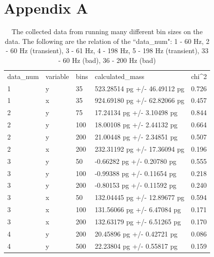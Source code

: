\documentclass[12pt]{article}
\begin{document}
\newpage
\clearpage
\section*{Appendix A}


\begin{longtable}{lllll}
\caption{The collected data from running many different bin sizes on the data. The following are the relation of the ``data\_num": 1 - 60 Hz, 2 - 60 Hz (transient), 3 - 61 Hz, 4 - 198 Hz, 5 - 198 Hz (transient), 33 - 60 Hz (bad), 36 - 200 Hz (bad)}
\label{tab:calc_data}\\
data\_num & variable & bins & calculated\_mass             & chi\textasciicircum{}2 \\
1         & y        & 35   & 523.28514 pg +/- 46.49112 pg & 0.726                  \\
1         & x        & 35   & 924.69180 pg +/- 62.82066 pg & 0.457                  \\
2         & y        & 75   & 17.24134 pg +/- 3.10498 pg   & 0.844                  \\
2         & y        & 100  & 18.00108 pg +/- 2.44132 pg   & 0.664                  \\
2         & y        & 200  & 21.00448 pg +/- 2.34851 pg   & 0.507                  \\
2         & x        & 200  & 232.31192 pg +/- 17.36094 pg & 0.196                  \\
3         & y        & 50   & -0.66282 pg +/- 0.20780 pg   & 0.555                  \\
3         & y        & 100  & -0.99388 pg +/- 0.11654 pg   & 0.218                  \\
3         & y        & 200  & -0.80153 pg +/- 0.11592 pg   & 0.240                  \\
3         & x        & 50   & 132.04445 pg +/- 12.89677 pg & 0.594                  \\
3         & x        & 100  & 131.56066 pg +/- 6.47084 pg  & 0.171                  \\
3         & x        & 200  & 132.63179 pg +/- 6.51265 pg  & 0.170                  \\
4         & y        & 200  & 20.45896 pg +/- 0.42721 pg   & 0.086                  \\
4         & y        & 500  & 22.23804 pg +/- 0.55817 pg   & 0.159                  \\

\end{longtable}
\end{document}

